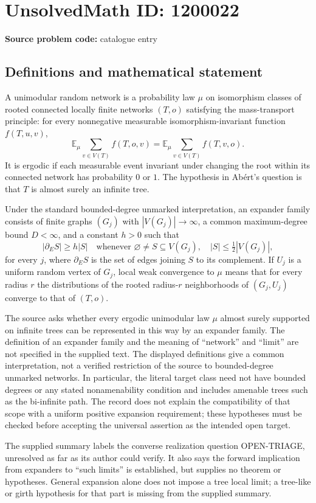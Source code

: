 \documentclass[11pt]{article}
\begin{document}
\section*{UnsolvedMath ID: 1200022}
\textbf{Source problem code:} catalogue entry
\subsection{Definitions and mathematical statement}
A unimodular random network is a probability law $\mu$ on isomorphism classes of rooted connected locally finite networks $(T,o)$ satisfying the mass-transport principle: for every nonnegative measurable isomorphism-invariant function $f(T,u,v)$,
\[
\mathbb E_\mu\sum_{v\in V(T)}f(T,o,v)
=\mathbb E_\mu\sum_{v\in V(T)}f(T,v,o).
\]
It is ergodic if each measurable event invariant under changing the root within its connected network has probability $0$ or $1$. The hypothesis in Ab\'ert's question is that $T$ is almost surely an infinite tree.

Under the standard bounded-degree unmarked interpretation, an expander family consists of finite graphs $(G_j)$ with $|V(G_j)|\to\infty$, a common maximum-degree bound $D<\infty$, and a constant $h>0$ such that
\[
|\partial_E S|\geq h|S|
\quad\text{whenever }\varnothing\ne S\subseteq V(G_j),\quad |S|\leq\tfrac12|V(G_j)|,
\]
for every $j$, where $\partial_E S$ is the set of edges joining $S$ to its complement. If $U_j$ is a uniform random vertex of $G_j$, local weak convergence to $\mu$ means that for every radius $r$ the distributions of the rooted radius-$r$ neighborhoods of $(G_j,U_j)$ converge to that of $(T,o)$.

The source asks whether every ergodic unimodular law $\mu$ almost surely supported on infinite trees can be represented in this way by an expander family. The definition of an expander family and the meaning of ``network'' and ``limit'' are not specified in the supplied text. The displayed definitions give a common interpretation, not a verified restriction of the source to bounded-degree unmarked networks. In particular, the literal target class need not have bounded degrees or any stated nonamenability condition and includes amenable trees such as the bi-infinite path. The record does not explain the compatibility of that scope with a uniform positive expansion requirement; these hypotheses must be checked before accepting the universal assertion as the intended open target.

The supplied summary labels the converse realization question OPEN-TRIAGE, unresolved as far as its author could verify. It also says the forward implication from expanders to ``such limits'' is established, but supplies no theorem or hypotheses. General expansion alone does not impose a tree local limit; a tree-like or girth hypothesis for that part is missing from the supplied summary.
\end{document}
